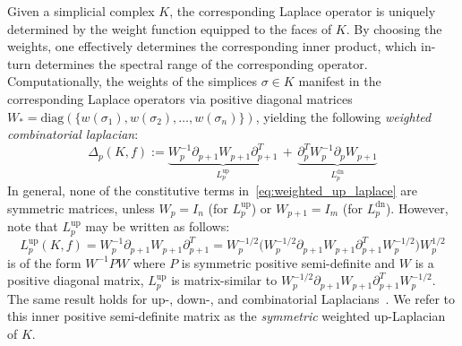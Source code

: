 \documentclass[12pt]{article}
\numberwithin{equation}{section}
\newcommand{\+}{%
	\raisebox{0.18ex}{\scaleobj{0.55}{+}}
}
\theoremstyle{definition}
\begin{document}
Given a simplicial complex $K$, the corresponding Laplace operator is uniquely determined by the weight function equipped to the faces of $K$. 
By choosing the weights, one effectively determines the corresponding inner product, which in-turn determines the spectral range of the corresponding operator. Computationally, the weights of the simplices $\sigma \in K$ manifest in the corresponding Laplace operators via positive diagonal matrices $W_\ast = \mathrm{diag}(\{w(\sigma_1), w(\sigma_2), \dots, w(\sigma_n)\})$, 
yielding the following \emph{weighted combinatorial laplacian}:  
\begin{equation}\label{eq:weighted_up_laplace}
	\Delta_p(K, f) := \underbrace{W_p^{-1} \partial_{p+1} W_{p+1} \partial_{p+1}^T}_{L_p^{\mathrm{up}}} \, + \, \underbrace{\partial_{p}^T W_p^{-1} \partial_p W_{p+1}}_{L_p^{\mathrm{dn}}}
\end{equation} 
In general, none of the constitutive terms in~\eqref{eq:weighted_up_laplace} are symmetric matrices, unless $W_p = I_n$ (for $L_p^{\text{up}}$) or $W_{p+1} = I_m$ (for $L_p^{\text{dn}}$). 
However, note that $L_p^{\text{up}}$ may be written as follows: 
\begin{equation}\label{eq:l_up}
	L_p^{\text{up}}(K, f) = W_p^{-1} \partial_{p+1} W_{p+1} \partial_{p+1}^T  = W_p^{-1/2} \big( W_p^{-1/2}  \partial_{p+1} W_{p+1} \partial_{p+1}^T W_p^{-1/2}  \big ) W_p^{1/2} 
\end{equation}
is of the form $W^{-1} P W$ where $P$ is symmetric positive semi-definite and $W$ is a positive diagonal matrix, $L_p^{\text{up}}$ is matrix-similar to $W_p^{-1/2}  \partial_{p+1} W_{p+1} \partial_{p+1}^T W_p^{-1/2}$. 
The same result holds for up-, down-, and combinatorial Laplacians~\cite{}. We refer to this inner positive semi-definite matrix as the \emph{symmetric} weighted up-Laplacian of $K$. 
\end{document}
